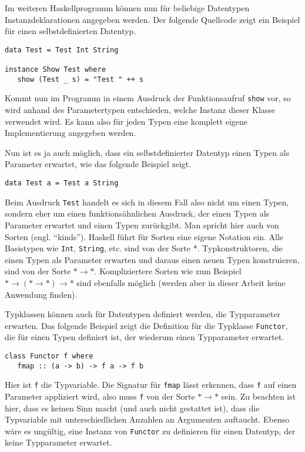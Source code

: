 Im weiteren Haskellprogramm können nun für beliebige Datentypen Instanzdeklarationen angegeben werden. Der folgende
Quellcode zeigt ein Beispiel für einen selbstdefinierten Datentyp.

\begin{verbatim}
data Test = Test Int String

instance Show Test where
   show (Test _ s) = "Test " ++ s
\end{verbatim}

Kommt nun im Programm in einem Ausdruck der Funktionsaufruf \texttt{show} vor, so wird anhand des Parametertypen
entschieden, welche Instanz dieser Klasse verwendet wird. Es kann also für jeden Typen eine komplett eigene Implementierung
angegeben werden.

Nun ist es ja auch möglich, dass ein selbstdefinierter Datentyp einen Typen als Parameter erwartet, wie das folgende Beispiel
zeigt.

\begin{verbatim}
data Test a = Test a String
\end{verbatim}

Beim Ausdruck \texttt{Test} handelt es sich in diesem Fall also nicht um einen Typen, sondern eher um einen funktionsähnlichen Ausdruck, der
einen Typen als Parameter erwartet und einen Typen zurückgibt. Man spricht hier auch von Sorten (engl. ``kinds''). Haskell
führt für Sorten eine eigene Notation ein. Alle Basistypen wie \texttt{Int}, \texttt{String}, etc. sind von der Sorte *.
Typkonstruktoren, die einen Typen als Parameter erwarten und daraus einen neuen Typen konstruieren, sind von der Sorte
$* \rightarrow *$.
Kompliziertere Sorten wie zum Beispiel $* \rightarrow (* \rightarrow *) \rightarrow *$ sind ebenfalls möglich (werden aber in dieser
Arbeit keine Anwendung finden).

Typklassen können auch für Datentypen definiert werden, die Typparameter erwarten. Das folgende Beispiel zeigt die
Definition für die Typklasse \texttt{Functor}, die für einen Typen definiert ist, der wiederum einen Typparameter erwartet.

\begin{verbatim}
class Functor f where
   fmap :: (a -> b) -> f a -> f b
\end{verbatim}

Hier ist \texttt{f} die Typvariable. Die Signatur für \texttt{fmap} lässt erkennen, dass \texttt{f} auf einen Parameter appliziert
wird, also muss \texttt{f} von der Sorte $* \rightarrow *$ sein. Zu beachten ist hier, dass es keinen Sinn macht (und auch nicht
gestattet ist), dass die Typvariable mit unterschiedlichen Anzahlen an Argumenten auftaucht. Ebenso wäre es ungültig,
eine Instanz von \texttt{Functor} zu definieren für einen Datentyp, der keine Typparameter erwartet.

